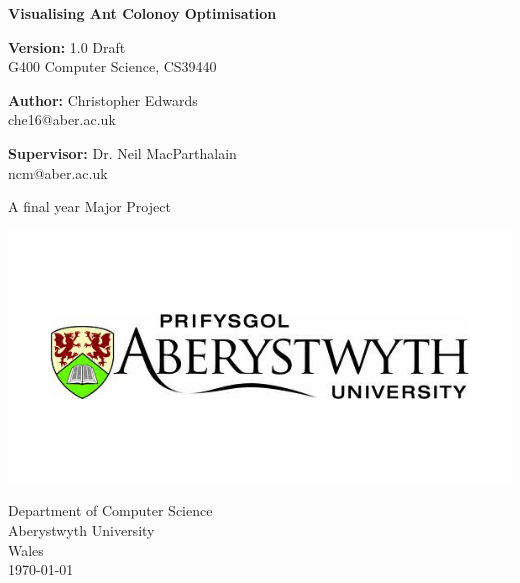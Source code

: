 \documentclass[10pt,a4paper]{article}
\begin{document}
\begin{titlepage}
\thispagestyle{empty}
    \begin{center}
        \vspace{1cm}
        
        \Huge
        \textbf{Visualising Ant Colonoy Optimisation}
        
	 \vspace{0.5cm}
        \Large
	 \textbf{Version:} 1.0 Draft \\
        G400  Computer Science, CS39440
	  

        \vspace{1.0cm}
        
	  \Large
        \textbf{Author:} Christopher Edwards \\
         che16@aber.ac.uk

 	  \vspace{0.8cm}
 	  \textbf{Supervisor:} Dr. Neil MacParthalain \\
         ncm@aber.ac.uk
        
        \vspace{1.5cm}
           A final year Major Project
           
       \includegraphics[scale=0.6]{unilogo}
        
  
                
        \vspace{0.8cm}
                
        \Large
        Department of Computer Science\\
        Aberystwyth University\\
        Wales\\
        \today
        
	\end{center}
\end{titlepage}


\newpage

\newpage
\end{document}
